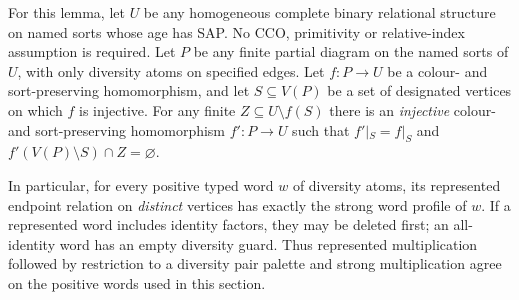 \begin{lemma}
\label{lem:typed-injectivisation}
For this lemma, let $U$ be any homogeneous complete binary relational
structure on named sorts whose age has SAP. No CCO, primitivity or
relative-index assumption is required.
Let $P$ be any finite partial diagram on the named sorts of $U$, with
only diversity atoms on specified edges.  Let $f:P\to U$ be a
colour- and sort-preserving homomorphism, and let $S\subseteq V(P)$
be a set of designated vertices on which $f$ is injective.  For any
finite $Z\subseteq U\setminus f(S)$ there is an \emph{injective}
colour- and sort-preserving homomorphism $f':P\to U$ such that
$f'|_S=f|_S$ and $f'(V(P)\setminus S)\cap Z=\varnothing$.

In particular, for every positive typed word $w$ of diversity atoms,
its represented endpoint relation on \emph{distinct} vertices has
exactly the strong word profile of $w$.  If a represented word includes
identity factors, they may be deleted first; an all-identity word has
an empty diversity guard.  Thus represented multiplication followed
by restriction to a diversity pair palette and strong multiplication
agree on the positive words used in this section.
\end{lemma}
